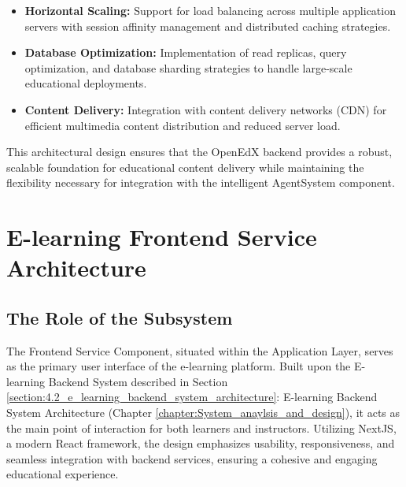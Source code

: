 \documentclass[../Main.tex]{subfiles}
\begin{document}
{{	\begin{itemize}
		\item \textbf{Horizontal Scaling:} Support for load balancing across
			multiple application servers with session affinity management and
			distributed caching strategies.

		\item \textbf{Database Optimization:} Implementation of read replicas, query
			optimization, and database sharding strategies to handle large-scale
			educational deployments.

		\item \textbf{Content Delivery:} Integration with content delivery networks
			(CDN) for efficient multimedia content distribution and reduced server
			load.
	\end{itemize}

	This architectural design ensures that the OpenEdX backend provides a robust, scalable
	foundation for educational content delivery while maintaining the flexibility necessary
	for integration with the intelligent AgentSystem component.

	\section{E-learning Frontend Service Architecture}
	\label{section:4.3_e_learning_frontend_service_architecture}

	\subsection{The Role of the Subsystem}
	\label{section:4.3.1_the_role_of_the_subsystem}
	\begin{condensed_idea}
		The Frontend Service Component, situated within the Application Layer, serves as the primary user interface of the e-learning platform. Built upon the E-learning Backend System described in Section \ref{section:4.2_e_learning_backend_system_architecture}: E-learning Backend System Architecture (Chapter \ref{chapter:System_anaylsis_and_design}), it acts as the main point of interaction for both learners and instructors. Utilizing NextJS, a modern React framework, the design emphasizes usability, responsiveness, and seamless integration with backend services, ensuring a cohesive and engaging educational experience.
	\end{condensed_idea}

}}
\end{document}
